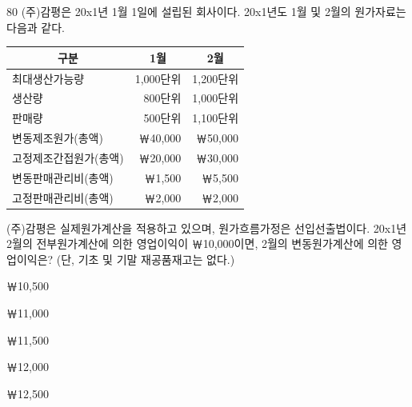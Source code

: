 \begin{question}{80}
(주)감평은 20x1년 1월 1일에 설립된 회사이다. 20x1년도 1월 및 2월의 원가자료는 다음과 같다.
\par{\small\centering\begin{tabular}{|l|r|r|}
\hline
\multicolumn{1}{|c|}{구분} & \multicolumn{1}{c|}{1월} & \multicolumn{1}{c|}{2월} \\ \hline
최대생산가능량 & 1,000단위 & 1,200단위 \\ \hline
생산량 & 800단위 & 1,000단위 \\ \hline
판매량 & 500단위 & 1,100단위 \\ \hline
변동제조원가(총액) & ￦40,000 & ￦50,000 \\ \hline
고정제조간접원가(총액) & ￦20,000 & ￦30,000 \\ \hline
변동판매관리비(총액) & ￦1,500 & ￦5,500 \\ \hline
고정판매관리비(총액) & ￦2,000 & ￦2,000 \\ \hline
\end{tabular}\par}
(주)감평은 실제원가계산을 적용하고 있으며, 원가흐름가정은 선입선출법이다. 20x1년 2월의 전부원가계산에 의한 영업이익이 ￦10,000이면, 2월의 변동원가계산에 의한 영업이익은? (단, 기초 및 기말 재공품재고는 없다.) \par
\begin{choices}
  \item ￦10,500
  \item ￦11,000
  \item ￦11,500
  \item ￦12,000
  \item ￦12,500
\end{choices}
\end{question}
